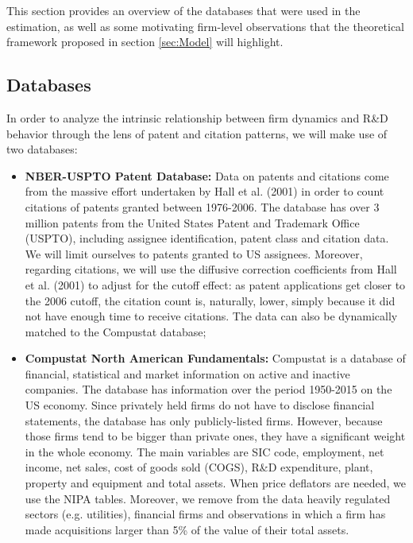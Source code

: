 \documentclass[letterpaper,12pt]{article}
\theoremstyle{definition}
\begin{document}
This section provides an overview of the databases that were used in the estimation, as well as some motivating firm-level observations that the theoretical framework proposed in section \ref{sec:Model} will highlight.

\subsection{Databases}

In order to analyze the intrinsic relationship between firm dynamics and R\&D behavior through the lens of patent and citation patterns, we will make use of two databases:

\begin{itemize}
	\item \textbf{NBER-USPTO Patent Database:} Data on patents and citations come from the massive effort undertaken by Hall et al. (2001) in order to count citations of patents granted between 1976-2006. The database has over 3 million patents from the United States Patent and Trademark Office (USPTO), including assignee identification, patent class and citation data. We will limit ourselves to patents granted to US assignees. Moreover, regarding citations, we will use the diffusive correction coefficients from Hall et al. (2001) to adjust for the cutoff effect: as patent applications get closer to the 2006 cutoff, the citation count is, naturally, lower, simply because it did not have enough time to receive citations. The data can also be dynamically matched to the Compustat database;
	\item \textbf{Compustat North American Fundamentals:} Compustat is a database of financial, statistical and market information on active and inactive companies. The database has information over the period 1950-2015 on the US economy. Since privately held firms do not have to disclose financial statements, the database has only publicly-listed firms. However, because those firms tend to be bigger than private ones, they have a significant weight in the whole economy. The main variables are SIC code, employment, net income, net sales, cost of goods sold (COGS), R\&D expenditure, plant, property and equipment and total assets. When price deflators are needed, we use the NIPA tables. Moreover, we remove from the data heavily regulated sectors (e.g. utilities), financial firms and observations in which a firm has made acquisitions larger than 5\% of the value of their total assets.
\end{itemize}
\end{document}
